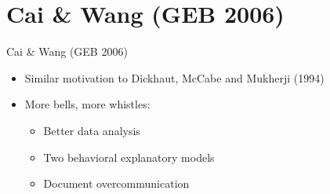 \documentclass{beamer}
\begin{document}
\section{Cai \& Wang (GEB 2006)}
\begin{frame}{Cai \& Wang (GEB 2006)}
\begin{card}
	\begin{itemize}
		\item Similar motivation to Dickhaut, McCabe and Mukherji (1994)
		\item More bells, more whistles:
		\begin{itemize}
			\item Better data analysis
			\item Two behavioral explanatory models
			\item Document overcommunication
		\end{itemize}
	\end{itemize}
\end{card}
\end{frame}
\end{document}
